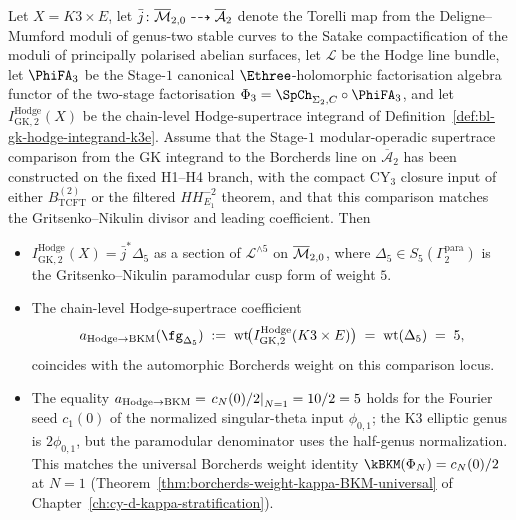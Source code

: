 \begin{theorem}
\label{thm:bl-hodge-k3e-kappa5}
Let $X = K3 \times E$, let $\bar j \colon \overline{\mathcal M}_{2, 0} \dashrightarrow \overline{\mathcal A}_2$ denote the Torelli map from the Deligne--Mumford moduli of genus-two stable curves to the Satake compactification of the moduli of principally polarised abelian surfaces, let $\mathcal L$ be the Hodge line bundle, let $\PhiFA_3$ be the Stage-$1$ canonical $\Ethree$-holomorphic factorisation algebra functor of the two-stage factorisation $\Phi_3 = \SpCh_{\Sigma_2, C} \circ \PhiFA_3$, and let $I^{\mathrm{Hodge}}_{\mathrm{GK}, 2}(X)$ be the chain-level Hodge-supertrace integrand of Definition~\ref{def:bl-gk-hodge-integrand-k3e}. Assume that the Stage-$1$ modular-operadic supertrace comparison from the GK integrand to the Borcherds line on $\overline{\mathcal A}_2$ has been constructed on the fixed H1--H4 branch, with the compact CY$_3$ closure input of either $B_{\mathrm{TCFT}}^{(2)}$ or the filtered $HH^{-2}_{E_1}$ theorem, and that this comparison matches the Gritsenko--Nikulin divisor and leading coefficient. Then
\begin{itemize}
 \item[\textup{(i)}] $I^{\mathrm{Hodge}}_{\mathrm{GK}, 2}(X) = \bar j^* \Delta_5$ as a section of $\mathcal L^{\wedge 5}$ on $\overline{\mathcal M}_{2, 0}$, where $\Delta_5 \in S_5(\Gamma_2^{\mathrm{para}})$ is the Gritsenko--Nikulin paramodular cusp form of weight $5$.
 \item[\textup{(ii)}] The chain-level Hodge-supertrace coefficient
 \[
 \aHodgeBKM(\fg_{\Delta_5}) \;:=\; \operatorname{wt}\!\bigl(I^{\mathrm{Hodge}}_{\mathrm{GK}, 2}(K3 \times E)\bigr) \;=\; \operatorname{wt}(\Delta_5) \;=\; 5,
 \]
 coincides with the automorphic Borcherds weight on this comparison locus.
 \item[\textup{(iii)}] The equality $a_{\mathrm{Hodge}\to\mathrm{BKM}} = \left.c_N(0)/2\right|_{N=1} = 10/2 = 5$ holds for the Fourier seed $c_1(0)$ of the normalized singular-theta input $\phi_{0, 1}$; the K3 elliptic genus is \(2\phi_{0,1}\), but the paramodular denominator uses the half-genus normalization. This matches the universal Borcherds weight identity $\kBKM(\Phi_N) = c_N(0)/2$ at $N = 1$ (Theorem~\ref{thm:borcherds-weight-kappa-BKM-universal} of Chapter~\ref{ch:cy-d-kappa-stratification}).
\end{itemize}
\end{theorem}

